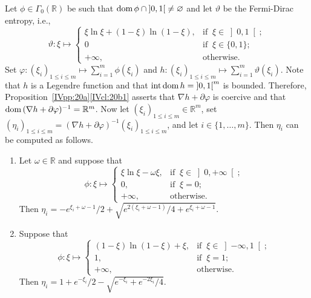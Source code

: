 \documentclass[a4paper,11pt,fleqn]{article}
\renewcommand{\leq}{\ensuremath{\leqslant}}
\newcommand{\emp}{\ensuremath{{\varnothing}}}
\newcommand{\RR}{\ensuremath{\mathbb{R}}}
\newcommand{\RPP}{\ensuremath{\left]0,+\infty\right[}}
\newcommand{\pinf}{\ensuremath{{+\infty}}}
\newcommand{\dom}{\ensuremath{\text{\rm dom}\,}}
\newcommand{\inte}{\ensuremath{\text{\rm int}\,}}
\theoremstyle{plain}{\theorembodyfont{\rmfamily}%
\newtheorem{conjecture}[theorem]{Conjecture}}
\theoremstyle{plain}{\theorembodyfont{\rmfamily}%
\newtheorem{example}[theorem]{Example}}
\theoremstyle{plain}{\theorembodyfont{\rmfamily}%
\newtheorem{remark}[theorem]{Remark}}
\theoremstyle{plain}{\theorembodyfont{\rmfamily}%
\newtheorem{algorithm}[theorem]{Algorithm}}
\theoremstyle{plain}{\theorembodyfont{\rmfamily}%
\newtheorem{condition}[theorem]{Condition}}
\theoremstyle{plain}{\theorembodyfont{\rmfamily}%
\newtheorem{definition}[theorem]{Definition}}
\theoremstyle{plain}{\theorembodyfont{\rmfamily}
\newtheorem{problem}[theorem]{Problem}}
\theoremstyle{plain}{\theorembodyfont{\rmfamily}
\newtheorem{notation}[theorem]{Notation}}
\numberwithin{equation}{section}
\begin{document}
\begin{example}
\label{IVex:2}
Let $\phi\in\Gamma_0(\RR)$ be such that 
$\dom\phi\cap\left]0,1\right[\neq\emp$ 
and let $\vartheta$ be the Fermi-Dirac entropy, i.e.,
\begin{equation}
\vartheta\colon\xi\mapsto
\begin{cases}
\xi\ln\xi+(1-\xi)\ln(1-\xi),&\text{if}\;\;\xi\in\left]0,1\right[;\\
0&\text{if}\;\;\xi\in\{0,1\};\\
\pinf,&\text{otherwise}.
\end{cases}
\end{equation}
Set $\varphi\colon(\xi_i)_{1\leq i\leq m}
\mapsto\sum_{i=1}^m\phi(\xi_i)$ 
and $h\colon(\xi_i)_{1\leq i\leq m}
\mapsto\sum_{i=1}^m\vartheta(\xi_i)$. 
Note that $h$ is a Legendre function \cite[Sections~5 and 6]{BB97} 
and that $\inte\dom h=\left]0,1\right[^m$ is bounded. Therefore,  
Proposition~\ref{IVpp:20a}\ref{IVcl:20b1} asserts that 
$\nabla h+\partial\varphi$ is coercive and that
$\dom(\nabla h+\partial\varphi)^{-1}=\RR^m$. 
Now let $(\xi_i)_{1\leq i\leq m}\in\RR^m$, 
set $(\eta_i)_{1\leq i\leq m}
=(\nabla h+\partial\varphi)^{-1}(\xi_i)_{1\leq i\leq m}$, 
and let $i\in\{1,\ldots,m\}$. Then $\eta_i$ can be computed 
as follows.
\begin{enumerate}
\item
\label{IVex:2i}
Let $\omega\in\RR$ and suppose that
\begin{equation}
\phi\colon\xi\mapsto
\begin{cases}
\xi\ln\xi-\omega\xi,&\text{if}\;\;\xi\in\RPP;\\
0,&\text{if}\;\;\xi=0;\\
\pinf,&\text{otherwise}.
\end{cases}
\end{equation}
Then $\eta_i=-e^{\xi_i+\omega-1}/2+\sqrt{e^{2(\xi_i+\omega-1)}/4
+e^{\xi_i+\omega-1}}$.
\item
\label{IVex:2ii}
Suppose that
\begin{equation}
\phi\colon\xi\mapsto
\begin{cases}
(1-\xi)\ln(1-\xi)+\xi,&\text{if}\;\;\xi\in\left]-\infty,1\right[;\\
1,&\text{if}\;\;\xi=1;\\
\pinf,&\text{otherwise}.
\end{cases}
\end{equation}
Then $\eta_i=1+e^{-\xi_i}/2-\sqrt{e^{-\xi_i}+e^{-2\xi_i}/4}$.
\end{enumerate}
\end{example}
\end{document}
